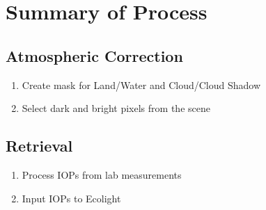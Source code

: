 \section{Summary of Process}
\subsection{Atmospheric Correction}
\begin{enumerate}
  \item Create mask for Land/Water and Cloud/Cloud Shadow
  \item Select dark and bright pixels from the scene
\end{enumerate}

\subsection{Retrieval}
\begin{enumerate}
  \item Process IOPs from lab measurements
  \item Input IOPs to Ecolight
\end{enumerate}





